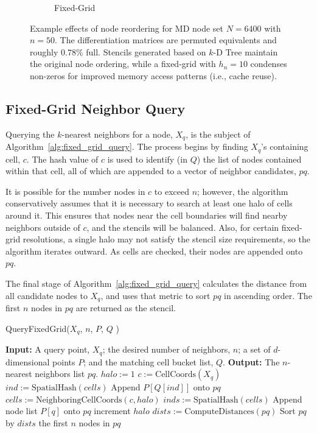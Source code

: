 \documentclass{report}
\begin{document}
\begin{figure}
\begin{subfigure}{0.425\textwidth}
\caption{Fixed-Grid}
\end{subfigure}
\caption{Example effects of node reordering for MD node set $N=6400$ with $n=50$. The differentiation matrices are permuted equivalents and roughly $0.78\%$ full. Stencils generated based on $k$-D Tree maintain the original node ordering, while a fixed-grid with $h_n=10$ condenses non-zeros for improved memory access patterns (i.e., cache reuse).}
\label{fig:reorder_example}
\end{figure} 

\subsection{Fixed-Grid Neighbor Query}

Querying the $k$-nearest neighbors for a node, $X_q$, is the subject of Algorithm~\ref{alg:fixed_grid_query}. The process begins by finding $X_q$'s containing cell, $c$. The hash value of $c$ is used to identify (in $Q$) the list of nodes contained within that cell, all of which are appended to a vector of neighbor candidates, $pq$. 

It is possible for the number nodes in $c$ to exceed $n$; however, the algorithm conservatively assumes that it is necessary to search at least one halo of cells around it.  This ensures that nodes near the cell boundaries will find nearby neighbors outside of $c$, and the stencils will be balanced. Also, for certain fixed-grid resolutions, a single halo may not satisfy the stencil size requirements, so the algorithm iterates outward. As cells are checked, their nodes are appended onto $pq$. 

The final stage of Algorithm~\ref{alg:fixed_grid_query} calculates the distance from all candidate nodes to $X_q$, and uses that metric to sort $pq$ in ascending order. The first $n$ nodes in $pq$ are returned as the stencil. 
\begin{algorithm} 
\caption{QueryFixedGrid($X_q$, $n$, $P$, $Q$ )}         
\label{alg:fixed_grid_query}  
\begin{algorithmic}[1]    
    \State \textbf{Input:} A query point, $X_q$; the desired number of neighbors, $n$; a set of $d$-dimensional points $P$; and the matching cell bucket list, $Q$.
    \State \textbf{Output:} The $n$-nearest neighbors list $pq$.
    \State     
    \State $halo := 1$
    \State $c := \text{CellCoords}(X_q)$ 
    \State $ind := \text{SpatialHash}(cells)$
    \State Append $P[Q[ind]]$ onto $pq$
        \State $cells := \text{NeighboringCellCoords}(c, halo)$
        \State $inds := \text{SpatialHash}(cells)$
            \State Append node list $P[q]$ onto $pq$
            \EndIf
        \EndFor
        \State increment $halo$
    \EndWhile
    \State $dists := \text{ComputeDistances}(pq)$
    \State Sort $pq$ by $dists$
    \State \Return the first $n$ nodes in $pq$
    \end{algorithmic}
\end{algorithm}
\end{document}
